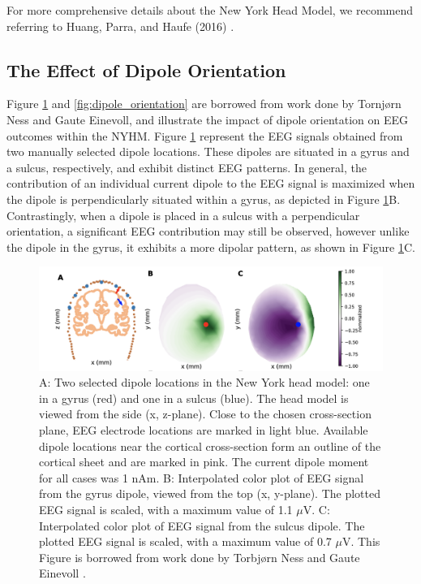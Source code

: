 \documentclass[a4paper, UKenglish, 11pt]{uiomaster}
\begin{document}
For more comprehensive details about the New York Head Model, we recommend referring to Huang, Parra, and Haufe (2016) \cite{huang2016new}.




\subsection{The Effect of Dipole Orientation}
Figure \ref{fig:gyrus_and_sulcus_EEG} and \ref{fig:dipole_orientation} are borrowed from work done by Tornjørn Ness and Gaute Einevoll, and illustrate the impact of dipole orientation on EEG outcomes within the NYHM.
Figure \ref{fig:gyrus_and_sulcus_EEG} represent the EEG signals obtained from two manually selected dipole locations. These dipoles are situated in a gyrus and a sulcus, respectively, and exhibit distinct EEG patterns.
In general, the contribution of an individual current dipole to the EEG signal is maximized when the dipole is perpendicularly situated within a gyrus, as depicted in Figure \ref{fig:gyrus_and_sulcus_EEG}B.
Contrastingly, when a dipole is placed in a sulcus with a perpendicular orientation, a significant EEG contribution may still be observed, however unlike the dipole in the gyrus, it exhibits a more dipolar pattern, as shown in Figure \ref{fig:gyrus_and_sulcus_EEG}C.


\begin{figure}[!htb]
    \centering
    \includegraphics[width=\linewidth]{figures/gyrus_and_sulcus_EEG.png}
    \caption{A: Two selected dipole locations in the New York head model: one in a gyrus (red) and one in a sulcus (blue). The head model is viewed from the side (x, z-plane). Close to the chosen cross-section plane, EEG electrode locations are marked in light blue. Available dipole locations near the cortical cross-section form an outline of the cortical sheet and are marked in pink. The current dipole moment for all cases was 1 nAm. B: Interpolated color plot of EEG signal from the gyrus dipole, viewed from the top (x, y-plane). The plotted EEG signal is scaled, with a maximum value of 1.1 $\mu$V. C: Interpolated color plot of EEG signal from the sulcus dipole. The plotted EEG signal is scaled, with a maximum value of 0.7 $\mu$V. This Figure is borrowed from work done by Torbjørn Ness and Gaute Einevoll \cite{naess2021biophysically}.}
    \label{fig:gyrus_and_sulcus_EEG}
\end{figure}
\end{document}
